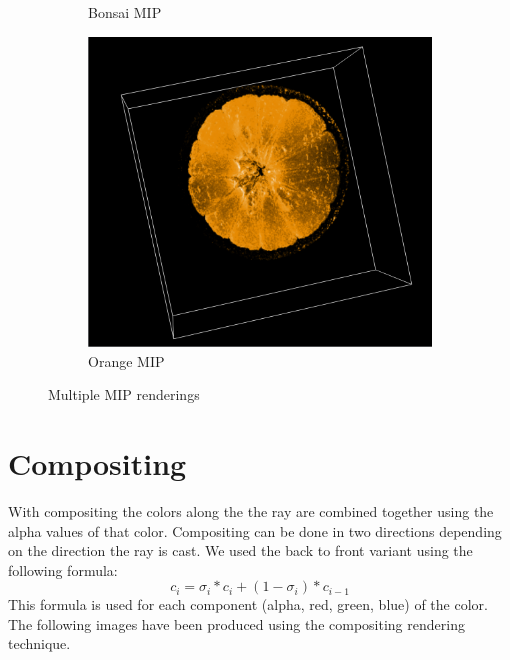 \documentclass[a4paper,twoside,11pt]{article}
\begin{document}
\begin{figure}[h!]
\begin{center}
\begin{subfigure}[b]{0.33\textwidth}
            \caption{Bonsai MIP}
            \label{fig:Bonsai}
        \end{subfigure}
        \begin{subfigure}[b]{0.30\textwidth}
            \includegraphics[width=\textwidth]{SanderImages/OrangeMIPZ.png}
            \caption{Orange MIP}
            \label{fig:OrangeMIP}
        \end{subfigure}
        \caption{Multiple MIP renderings}
    \end{center}
\end{figure} 

\newpage

\section{Compositing}
With compositing the colors along the the ray are combined together using the alpha values of that color. Compositing can be done in two directions depending on the direction the ray is cast.
We used the back to front variant using the following formula:
\begin{equation}\label{Compositing}
  c_i = \sigma_i * c_i + (1 - \sigma_i) * c_{i-1}
\end{equation}
This formula is used for each component (alpha, red, green, blue) of the color.
The following images have been produced using the compositing rendering technique.
\end{document}
